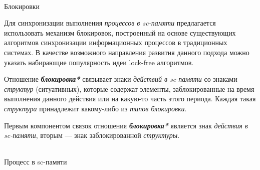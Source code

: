 \begin{frame}{\\Блокировки}
\topline
\justifying
\vspace{10mm}

Для синхронизации выполнения \textit{процессов в sc-памяти} предлагается использовать механизм блокировок, построенный на основе существующих алгоритмов синхронизации информационных процессов в традиционных системах. В качестве возможного направления развития данного подхода можно указать набирающие популярность идеи lock-free алгоритмов.

Отношение \textbf{\textit{блокировка*}} связывает знаки \textit{действий в sc-памяти} со знаками \textit{структур} (ситуативных), которые содержат элементы, заблокированные на время выполнения данного действия или на какую-то часть этого периода. Каждая такая \textit{структура} принадлежит какому-либо из \textit{типов блокировки}.

Первым компонентом связок отношения \textbf{\textit{блокировка*}} является знак \textit{действия в sc-памяти}, вторым --- знак заблокированной \textit{структуры}.
\end{frame}

\begin{frame}{\\Процесс в sc-памяти}
\topline
\justifying
\vspace{10mm}


\begin{SCn}
\begin{scnindent}
\begin{scneqtoset}
\end{scneqtoset}
\end{scnindent}
\end{SCn}
\end{frame}

